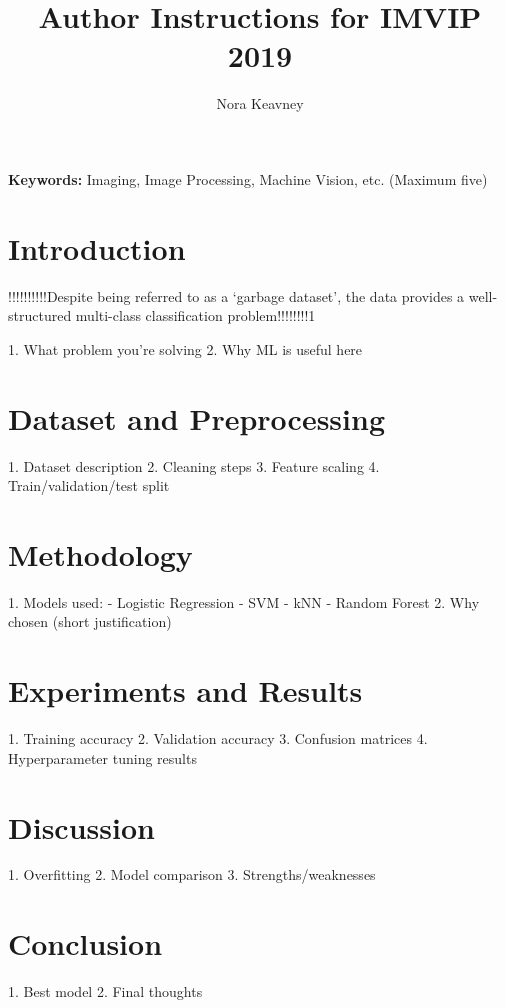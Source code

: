 \documentclass[a4paper,11pt]{article}
\begin{document}
\title{Author Instructions for IMVIP 2019}

\author{Nora Keavney}
\date{}
\maketitle
\thispagestyle{empty}



\begin{abstract}

\end{abstract}
\textbf{Keywords:} Imaging, Image Processing, Machine Vision, etc. (Maximum five)



\section{Introduction}

!!!!!!!!!!Despite being referred to as a 
‘garbage dataset’, the data provides a well-structured 
multi-class classification problem!!!!!!!!1

1. What problem you’re solving
2. Why ML is useful here

\section{Dataset and Preprocessing}
1. Dataset description
2. Cleaning steps
3. Feature scaling
4. Train/validation/test split

\section{Methodology}
1. Models used:
   - Logistic Regression
   - SVM
   - kNN
   - Random Forest
2. Why chosen (short justification)

\section{Experiments and Results}
1. Training accuracy
2. Validation accuracy
3. Confusion matrices
4. Hyperparameter tuning results

\section{Discussion}
1. Overfitting
2. Model comparison
3. Strengths/weaknesses

\section{Conclusion}
1. Best model
2. Final thoughts
\end{document}
